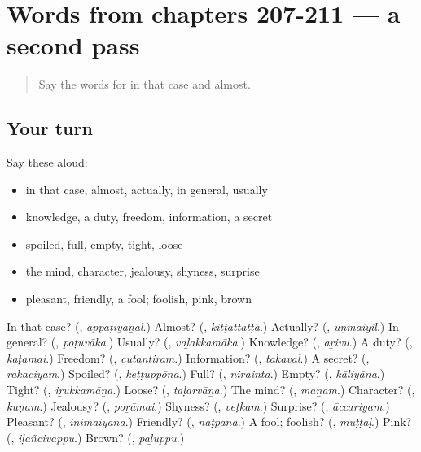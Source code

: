 \section[(dialogue)]{Words from chapters 207-211 — a second pass}

\label{lesson:TA-R211-second-pass-words-from-chapters-207-211}



\begin{quote}
Say the words for in that case and almost.
\end{quote}

\subsection*{Your turn}
Say these aloud:

\begin{itemize}
\raggedright
  \item in that case, almost, actually, in general, usually
  \item knowledge, a duty, freedom, information, a secret
  \item spoiled, full, empty, tight, loose
  \item the mind, character, jealousy, shyness, surprise
  \item pleasant, friendly, a fool; foolish, pink, brown
\end{itemize}

\begin{tcolorbox}[breakable,colback=teal!4,colframe=teal!35!black,title={Before you move on}]
In that case? (\textbf{}, \emph{appaṭiyāṉāl}.) Almost? (\textbf{}, \emph{kiṭṭattaṭṭa}.) Actually? (\textbf{}, \emph{uṇmaiyil}.) In general? (\textbf{}, \emph{poṭuvāka}.) Usually? (\textbf{}, \emph{vaḻakkamāka}.) Knowledge? (\textbf{}, \emph{aṟivu}.) A duty? (\textbf{}, \emph{kaṭamai}.) Freedom? (\textbf{}, \emph{cutantiram}.) Information? (\textbf{}, \emph{takaval}.) A secret? (\textbf{}, \emph{rakaciyam}.) Spoiled? (\textbf{}, \emph{keṭṭuppōṉa}.) Full? (\textbf{}, \emph{niṟainta}.) Empty? (\textbf{}, \emph{kāliyāṉa}.) Tight? (\textbf{}, \emph{iṟukkamāṉa}.) Loose? (\textbf{}, \emph{taḷarvāṉa}.) The mind? (\textbf{}, \emph{maṉam}.) Character? (\textbf{}, \emph{kuṇam}.) Jealousy? (\textbf{}, \emph{poṟāmai}.) Shyness? (\textbf{}, \emph{veṭkam}.) Surprise? (\textbf{}, \emph{āccariyam}.) Pleasant? (\textbf{}, \emph{iṉimaiyāṉa}.) Friendly? (\textbf{}, \emph{naṭpāṉa}.) A fool; foolish? (\textbf{}, \emph{muṭṭāḷ}.) Pink? (\textbf{}, \emph{iḷañcivappu}.) Brown? (\textbf{}, \emph{paḻuppu}.)
\end{tcolorbox}
